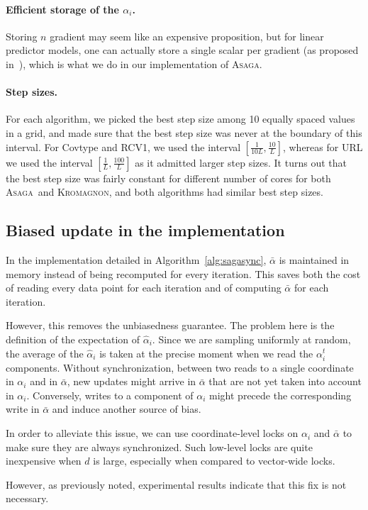 \documentclass[twoside]{article}
\newcommand{\ASAGA}{\textsc{Asaga}}
\newcommand{\KROMAGNON}{\textsc{Kromagnon}}
\begin{document}
\paragraph{Efficient storage of the $\alpha_i$.}
Storing $n$ gradient may seem like an expensive proposition, but for linear predictor models, one can actually store a single scalar per gradient (as proposed in~\citet{laggedsaga}), which is what we do in our implementation of \ASAGA.

\paragraph{Step sizes.} For each algorithm, we picked the best step size among 10 equally spaced values in a grid, and made sure that the best step size was never at the boundary of this interval. 
For Covtype and RCV1, we used the interval $[\frac{1}{10L}, \frac{10}{L}]$, whereas for URL we used  the interval $[\frac{1}{L}, \frac{100}{L}]$ as it admitted larger step sizes.
It turns out that the best step size was fairly constant for different number of cores for both \ASAGA\ and \KROMAGNON, and both algorithms had similar best step sizes.

\subsection{Biased update in the implementation}\label{apx:Bias}
In the implementation detailed in Algorithm~\ref{alg:sagasync}, $\bar \alpha$ is maintained in memory instead of being recomputed for every iteration.
This saves both the cost of reading every data point for each iteration and of computing $\bar \alpha$ for each iteration.

However, this removes the unbiasedness guarantee.
The problem here is the definition of the expectation of $\hat \alpha_i$.
Since we are sampling uniformly at random, the average of the $\hat \alpha_i$ is taken at the precise moment when we read the $\alpha_i^t$ components. 
Without synchronization, between two reads to a single coordinate in $\alpha_i$ and in $\bar \alpha$, new updates might arrive in $\bar \alpha$ that are not yet taken into account in $\alpha_i$. 
Conversely, writes to a component of $\alpha_i$ might precede the corresponding write in $\bar \alpha$ and induce another source of bias. 

In order to alleviate this issue, we can use coordinate-level locks on $\alpha_i$ and $\bar \alpha$ to make sure they are always synchronized. 
Such low-level locks are quite inexpensive when $d$ is large, especially when compared to vector-wide locks.

However, as previously noted, experimental results indicate that this fix is not necessary.
\end{document}
